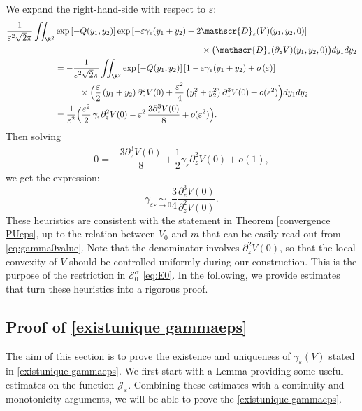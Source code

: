 \documentclass[JEP,XML,SOM,Unicode]{cedram}
\let\mathcal\mathscr
\theoremstyle{plain}
\theoremstyle{definition}
\newcommand{\D}{\mathcal{D}_\eps}
\newcommand{\Je}{\mathcal{J}_\eps}
\let\eps\varepsilon
\newcommand{\Eaz}{\mathcal{E}^\alpha_0}
\begin{document}
We expand the right-hand-side with respect to $\eps$:
\begin{align*}
\dfrac{1}{\eps^2\sqrt{2}\pi}\iint_{\R^2}& \exp \left[-Q(y_1,y_2) \right] \exp \left[ - \eps \gamma_\eps (y_1+y_2) + 2 \D(V)(y_1,y_2,0) \right]\\
& \hspace*{6cm}\times\bigl(\D(\partial_z V)(y_1,y_2,0) \bigr) d y_1 d y_2 \\
&=
- \dfrac{1}{\eps^2 \sqrt{2}\pi}\iint_{\R^2} \exp \left[-Q(y_1,y_2) \right] \left[1 - \eps \gamma_\eps (y_1+y_2) + o\left (\eps \right) \right]
\\
&\hspace*{1cm}\times \Bigl (\frac\eps2 \left (y_1 + y_2 \right) \partial_z^2 V(0) + \dfrac{\eps^2}4 \left (y_1^2 + y_2^2\right) \partial_z^3 V(0) + o(\eps^2) \Bigr) d y_1 d y_2
\\
& =\frac1{\eps^2} \Bigl(\dfrac{\eps^2}{2}\, \gamma_\eps \partial_z^2 V(0) - \eps^2\, \dfrac{3 \partial_z^3 V(0)}{8} + o(\eps^2) \Bigr).
\end{align*}
Then solving
\begin{align*}
0 = - \dfrac{3 \partial_z^3 V(0)}{8}+ \dfrac{1}{2} \gamma_\eps \partial_z^2 V(0) + o(1),
\end{align*}
we get the expression:
\begin{equation}\label{eq:gammaepsd=1}
\gamma_\eps \underset{\eps \to 0}{\sim} \dfrac{3}{4}\dfrac{\partial_z^3V(0)}{\partial_z^2 V(0)}.
\end{equation}
These heuristics are consistent with the statement in Theorem \ref{convergence PUeps}, up to the relation between $V_0$ and $m$ that can be easily read out from \eqref{eq:gamma0value}. Note that the denominator involves $\partial_z^2 V(0)$, so that the local convexity of $V$ should be controlled uniformly during our construction. This is the purpose of the restriction in $\Eaz$ \eqref{eq:E0}. In the following, we provide estimates that turn these heuristics into a rigorous proof.

\subsection{Proof of \cref{existunique gammaeps}}\label{sec:proof of prop24}
The aim of this section is to prove the existence and uniqueness of $\gamma_\eps(V)$ stated in \cref{existunique gammaeps}. We first start with a Lemma providing some useful estimates on the function $\Je$. Combining these estimates with a continuity and monotonicity arguments, we will be able to prove the \cref{existunique gammaeps}.
\end{document}
